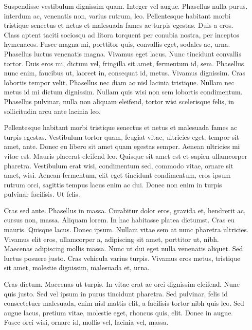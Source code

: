 Suspendisse vestibulum dignissim quam. Integer vel augue. Phasellus nulla purus, interdum ac, venenatis non, varius rutrum, leo. Pellentesque habitant morbi tristique senectus et netus et malesuada fames ac turpis egestas. Duis a eros. Class aptent taciti sociosqu ad litora torquent per conubia nostra, per inceptos hymenaeos. Fusce magna mi, porttitor quis, convallis eget, sodales ac, urna. Phasellus luctus venenatis magna. Vivamus eget lacus. Nunc tincidunt convallis tortor. Duis eros mi, dictum vel, fringilla sit amet, fermentum id, sem. Phasellus nunc enim, faucibus ut, laoreet in, consequat id, metus. Vivamus dignissim. Cras lobortis tempor velit. Phasellus nec diam ac nisl lacinia tristique. Nullam nec metus id mi dictum dignissim. Nullam quis wisi non sem lobortis condimentum. Phasellus pulvinar, nulla non aliquam eleifend, tortor wisi scelerisque felis, in sollicitudin arcu ante lacinia leo.

Pellentesque habitant morbi tristique senectus et netus et malesuada fames ac turpis egestas. Vestibulum tortor quam, feugiat vitae, ultricies eget, tempor sit amet, ante. Donec eu libero sit amet quam egestas semper. Aenean ultricies mi vitae est. Mauris placerat eleifend leo. Quisque sit amet est et sapien ullamcorper pharetra. Vestibulum erat wisi, condimentum sed, commodo vitae, ornare sit amet, wisi. Aenean fermentum, elit eget tincidunt condimentum, eros ipsum rutrum orci, sagittis tempus lacus enim ac dui. Donec non enim in turpis pulvinar facilisis. Ut felis.

Cras sed ante. Phasellus in massa. Curabitur dolor eros, gravida et, hendrerit ac, cursus non, massa. Aliquam lorem. In hac habitasse platea dictumst. Cras eu mauris. Quisque lacus. Donec ipsum. Nullam vitae sem at nunc pharetra ultricies. Vivamus elit eros, ullamcorper a, adipiscing sit amet, porttitor ut, nibh. Maecenas adipiscing mollis massa. Nunc ut dui eget nulla venenatis aliquet. Sed luctus posuere justo. Cras vehicula varius turpis. Vivamus eros metus, tristique sit amet, molestie dignissim, malesuada et, urna.

Cras dictum. Maecenas ut turpis. In vitae erat ac orci dignissim eleifend. Nunc quis justo. Sed vel ipsum in purus tincidunt pharetra. Sed pulvinar, felis id consectetuer malesuada, enim nisl mattis elit, a facilisis tortor nibh quis leo. Sed augue lacus, pretium vitae, molestie eget, rhoncus quis, elit. Donec in augue. Fusce orci wisi, ornare id, mollis vel, lacinia vel, massa.

